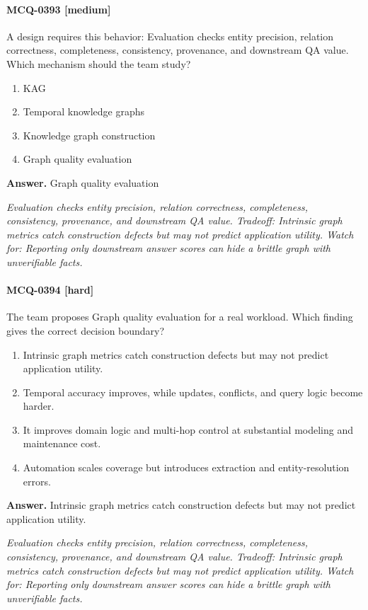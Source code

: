 \paragraph{MCQ-0393 [medium]} A design requires this behavior: Evaluation checks entity precision, relation correctness, completeness, consistency, provenance, and downstream QA value. Which mechanism should the team study?
\begin{enumerate}[label=\Alph*.]
\item KAG
\item Temporal knowledge graphs
\item Knowledge graph construction
\item Graph quality evaluation
\end{enumerate}
\noindent\textbf{Answer.} Graph quality evaluation
\par\textit{Evaluation checks entity precision, relation correctness, completeness, consistency, provenance, and downstream QA value. Tradeoff: Intrinsic graph metrics catch construction defects but may not predict application utility. Watch for: Reporting only downstream answer scores can hide a brittle graph with unverifiable facts.}
\paragraph{MCQ-0394 [hard]} The team proposes Graph quality evaluation for a real workload. Which finding gives the correct decision boundary?
\begin{enumerate}[label=\Alph*.]
\item Intrinsic graph metrics catch construction defects but may not predict application utility.
\item Temporal accuracy improves, while updates, conflicts, and query logic become harder.
\item It improves domain logic and multi-hop control at substantial modeling and maintenance cost.
\item Automation scales coverage but introduces extraction and entity-resolution errors.
\end{enumerate}
\noindent\textbf{Answer.} Intrinsic graph metrics catch construction defects but may not predict application utility.
\par\textit{Evaluation checks entity precision, relation correctness, completeness, consistency, provenance, and downstream QA value. Tradeoff: Intrinsic graph metrics catch construction defects but may not predict application utility. Watch for: Reporting only downstream answer scores can hide a brittle graph with unverifiable facts.}
